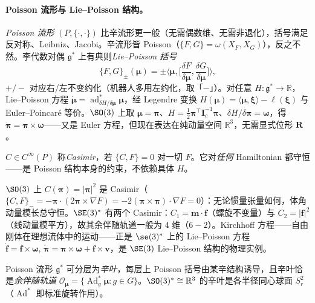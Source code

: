 \paragraph{Poisson 流形与 Lie--Poisson 结构。}
\emph{Poisson 流形} $(P,\{\cdot,\cdot\})$ 比辛流形更一般（无需偶数维、无需非退化），括号满足反对称、Leibniz、Jacobi。辛流形皆 Poisson（$\{F,G\}=\omega(X_F,X_G)$），反之不然。李代数对偶 $\mathfrak g^*$ 上有典则\emph{Lie--Poisson 括号}
\begin{equation}
  \{F,G\}_\pm(\boldsymbol\mu)=\pm\Big\langle\boldsymbol\mu,\Big[\frac{\delta F}{\delta\boldsymbol\mu},\frac{\delta G}{\delta\boldsymbol\mu}\Big]\Big\rangle,
  \label{eq:gm-lie-poisson}
\end{equation}
$+/-$ 对应右/左不变约化（机器人多用左约化，取「$-$」）。对任意 $H:\mathfrak g^*\to\mathbb R$，Lie--Poisson 方程 $\dot{\boldsymbol\mu}=\operatorname{ad}^*_{\delta H/\delta\boldsymbol\mu}\boldsymbol\mu$，经 Legendre 变换 $H(\boldsymbol\mu)=\langle\boldsymbol\mu,\boldsymbol\xi\rangle-\ell(\boldsymbol\xi)$ 与 Euler--Poincaré 等价。$\SO(3)$ 上取 $\boldsymbol\mu=\boldsymbol\pi$、$H=\tfrac12\boldsymbol\pi^\top\mathbf I_c^{-1}\boldsymbol\pi$、$\delta H/\delta\boldsymbol\pi=\boldsymbol\omega$，得 $\dot{\boldsymbol\pi}=\boldsymbol\pi\times\boldsymbol\omega$——又是 Euler 方程，但现在表达在纯动量空间 $\mathbb R^3$，无需显式位形 $\mathbf R$。

\begin{definition}[Casimir 函数]\label{def:gm-casimir}
$C\in C^\infty(P)$ 称\emph{Casimir}，若 $\{C,F\}=0$ 对一切 $F$。它对\emph{任何} Hamiltonian 都守恒——是 Poisson 结构本身的约束，不依赖具体 $H$。
\end{definition}

$\SO(3)$ 上 $C(\boldsymbol\pi)=|\boldsymbol\pi|^2$ 是 Casimir（$\{C,F\}_-=-\boldsymbol\pi\cdot(2\boldsymbol\pi\times\nabla F)=-2(\boldsymbol\pi\times\boldsymbol\pi)\cdot\nabla F=0$）：无论惯量张量如何，体角动量模长总守恒。$\SE(3)^*$ 有两个 Casimir：$C_1=\mathbf m\cdot\mathbf f$（螺旋不变量）与 $C_2=|\mathbf f|^2$（线动量模平方），故其余伴随轨道一般为 4 维（$6-2$）。Kirchhoff 方程——自由刚体在理想流体中的运动——正是 $\se(3)^*$ 上的 Lie--Poisson 方程 $\dot{\mathbf f}=\mathbf f\times\boldsymbol\omega,\,\dot{\boldsymbol\pi}=\boldsymbol\pi\times\boldsymbol\omega+\mathbf f\times\mathbf v$，是 $\SE(3)$ Lie--Poisson 结构的物理实例。

\begin{theorem}[Kirillov--Kostant--Souriau：辛叶 $=$ 余伴随轨道]\label{thm:gm-kks}
Poisson 流形 $\mathfrak g^*$ 可分层为\emph{辛叶}，每层上 Poisson 括号由某辛结构诱导，且辛叶恰是\emph{余伴随轨道} $\mathcal O_{\boldsymbol\mu}=\{\operatorname{Ad}^*_g\boldsymbol\mu:g\in G\}$。$\SO(3)^*\cong\mathbb R^3$ 的辛叶是各半径同心球面 $S^2_r$（$\operatorname{Ad}^*$ 即标准旋转作用）。
\end{theorem}

